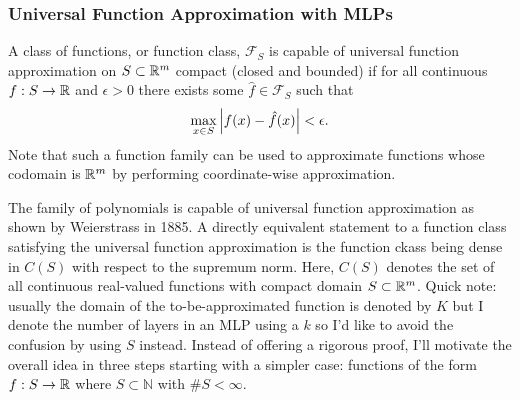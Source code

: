 \documentclass[11pt]{article}
\begin{document}
\subsubsection{Universal Function Approximation with MLPs}
\label{subsubsec:universal_function_approximation_theorem}
A class of functions, or function class, $\mathcal{F}_S$ is capable of universal function approximation on $S\subset\mathbb{R}^m$ compact (closed and bounded) if for all continuous $f:S\to\mathbb{R}$ and $\epsilon>0$ there exists some $\hat{f}\in\mathcal{F}_S$ such that
$$
\max_{x\in S}\left|f(x)-\hat{f}(x)\right|<\epsilon.
$$
Note that such a function family can be used to approximate functions whose codomain is $\mathbb{R}^m$ by performing coordinate-wise approximation. 

The family of polynomials is capable of universal function approximation as shown by Weierstrass in 1885. A directly equivalent statement to a function class satisfying the universal function approximation is the function ckass being dense in $C(S)$ with respect to the supremum norm. Here, $C(S)$ denotes the set of all continuous real-valued functions with compact domain $S\subset\mathbb{R}^m$. Quick note: usually the domain of the to-be-approximated function is denoted by $K$ but I denote the number of layers in an MLP using a $k$ so I'd like to avoid the confusion by using $S$ instead. Instead of offering a rigorous proof, I'll motivate the overall idea in three steps starting with a simpler case: functions of the form $f:S\to\mathbb{R}$ where $S\subset\mathbb{N}$ with $\#S<\infty$.
\end{document}
